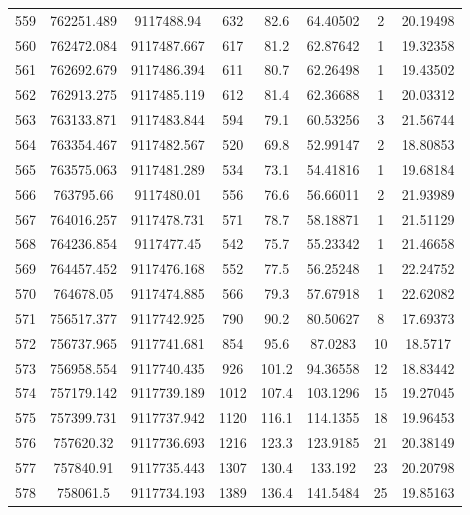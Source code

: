 \begin{longtable}{cccccccc}
559  & 762251.489      & 9117488.94       & 632     & 82.6  & 64.40502 & 2  & 20.19498 \\
560  & 762472.084      & 9117487.667      & 617     & 81.2  & 62.87642 & 1  & 19.32358 \\
561  & 762692.679      & 9117486.394      & 611     & 80.7  & 62.26498 & 1  & 19.43502 \\
562  & 762913.275      & 9117485.119      & 612     & 81.4  & 62.36688 & 1  & 20.03312 \\
563  & 763133.871      & 9117483.844      & 594     & 79.1  & 60.53256 & 3  & 21.56744 \\
564  & 763354.467      & 9117482.567      & 520     & 69.8  & 52.99147 & 2  & 18.80853 \\
565  & 763575.063      & 9117481.289      & 534     & 73.1  & 54.41816 & 1  & 19.68184 \\
566  & 763795.66       & 9117480.01       & 556     & 76.6  & 56.66011 & 2  & 21.93989 \\
567  & 764016.257      & 9117478.731      & 571     & 78.7  & 58.18871 & 1  & 21.51129 \\
568  & 764236.854      & 9117477.45       & 542     & 75.7  & 55.23342 & 1  & 21.46658 \\
569  & 764457.452      & 9117476.168      & 552     & 77.5  & 56.25248 & 1  & 22.24752 \\
570  & 764678.05       & 9117474.885      & 566     & 79.3  & 57.67918 & 1  & 22.62082 \\
571  & 756517.377      & 9117742.925      & 790     & 90.2  & 80.50627 & 8  & 17.69373 \\
572  & 756737.965      & 9117741.681      & 854     & 95.6  & 87.0283  & 10 & 18.5717  \\
573  & 756958.554      & 9117740.435      & 926     & 101.2 & 94.36558 & 12 & 18.83442 \\
574  & 757179.142      & 9117739.189      & 1012    & 107.4 & 103.1296 & 15 & 19.27045 \\
575  & 757399.731      & 9117737.942      & 1120    & 116.1 & 114.1355 & 18 & 19.96453 \\
576  & 757620.32       & 9117736.693      & 1216    & 123.3 & 123.9185 & 21 & 20.38149 \\
577  & 757840.91       & 9117735.443      & 1307    & 130.4 & 133.192  & 23 & 20.20798 \\
578  & 758061.5        & 9117734.193      & 1389    & 136.4 & 141.5484 & 25 & 19.85163 \\

\end{longtable}
